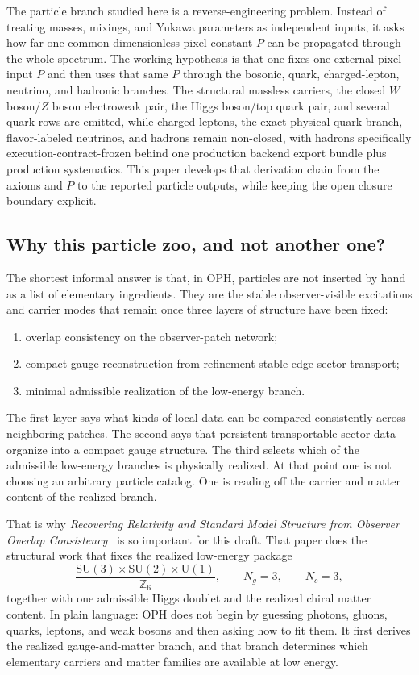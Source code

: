 \documentclass[11pt]{article}
\newcommand{\SU}{\mathrm{SU}}
\newcommand{\U}{\mathrm{U}}
\begin{document}
The particle branch studied here is a reverse-engineering problem. Instead of treating masses,
mixings, and Yukawa parameters as independent inputs, it asks how far one common dimensionless
pixel constant \(P\) can be propagated through the whole spectrum. The working hypothesis is that
one fixes one external pixel input \(P\) and then uses that same \(P\)
through the bosonic, quark, charged-lepton, neutrino, and hadronic branches. The structural
massless carriers, the closed \(W\) boson/\(Z\) boson electroweak pair, the Higgs boson/top quark pair,
and several quark rows are emitted, while charged leptons, the exact physical quark branch, flavor-labeled neutrinos, and
hadrons remain non-closed, with hadrons specifically execution-contract-frozen behind one production backend export bundle plus production systematics. This paper develops that derivation chain from the axioms and \(P\) to the
reported particle outputs, while keeping the open closure boundary explicit.

\subsection{Why this particle zoo, and not another one?}

The shortest informal answer is that, in OPH, particles are not inserted by hand as a list of
elementary ingredients. They are the stable observer-visible excitations and carrier modes that
remain once three layers of structure have been fixed:
\begin{enumerate}[leftmargin=2em]
\item overlap consistency on the observer-patch network;
\item compact gauge reconstruction from refinement-stable edge-sector transport;
\item minimal admissible realization of the low-energy branch.
\end{enumerate}
The first layer says what kinds of local data can be compared consistently across neighboring
patches. The second says that persistent transportable sector data organize into a compact gauge
structure. The third selects which of the admissible low-energy branches is physically realized.
At that point one is not choosing an arbitrary particle catalog. One is reading off the
carrier and matter content of the realized branch.

That is why \emph{Recovering Relativity and Standard Model Structure from Observer Overlap Consistency}~\cite{ophcompact} is so important for this draft. That paper does
the structural work that fixes the realized low-energy package
\[
\frac{\SU(3)\times\SU(2)\times\U(1)}{\mathbb Z_6},
\qquad
N_g=3,
\qquad
N_c=3,
\]
together with one admissible Higgs doublet and the realized chiral matter content. In plain
language: OPH does not begin by guessing photons, gluons, quarks, leptons, and weak bosons and
then asking how to fit them. It first derives the realized gauge-and-matter branch, and that
branch determines which elementary carriers and matter families are available at low energy.
\end{document}
